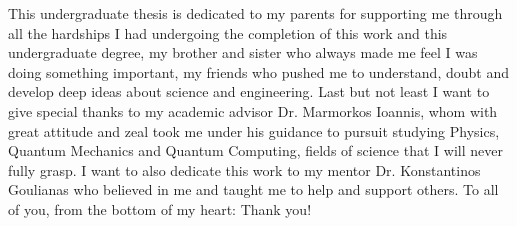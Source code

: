 \thispagestyle{empty} %

This undergraduate thesis is dedicated to my parents for supporting me through all the hardships I had undergoing the completion of this work and
this undergraduate degree, my brother and sister who always made me feel I was doing something important, my friends who pushed me to understand,
doubt and develop deep ideas about science and engineering. Last but not least I want to give special thanks to my academic advisor Dr. Marmorkos
Ioannis, whom with great attitude and zeal took me under his guidance to pursuit studying Physics, Quantum Mechanics and Quantum Computing, fields
of science that I will never fully grasp. I want to also dedicate this work to my mentor Dr. Konstantinos Goulianas who believed in me and taught
me to help and support others. To all of you, from the bottom of my heart: Thank you!
